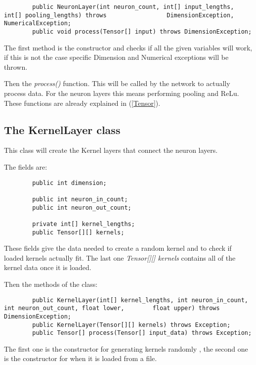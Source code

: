 \documentclass[12pt, titlepage]{article}
\begin{document}
		\begin{lstlisting}
		public NeuronLayer(int neuron_count, int[] input_lengths, int[] pooling_lengths) throws 				DimensionException, NumericalException;
		public void process(Tensor[] input) throws DimensionException;
		\end{lstlisting}
		
		The first method is the constructor and checks if all the given variables will work, if this is not the case specific Dimension and Numerical exceptions will be thrown.
		
		Then the \textit{process()} function. This will be called by the network to actually process data. For the neuron layers this means performing pooling and ReLu. These functions are already explained in (\ref{Tensor}).
		
		\pagebreak
		\subsection{The KernelLayer class}
		This class will create the Kernel layers that connect the neuron layers.
		
		The fields are:
		\begin{lstlisting}
		public int dimension;
		
		public int neuron_in_count;
		public int neuron_out_count;
		
		private int[] kernel_lengths;
		public Tensor[][] kernels;
		\end{lstlisting}
		
		These fields give the data needed to create a random kernel and to check if loaded kernels actually fit. The last one \textit{Tensor[][] kernels} contains all of the kernel data once it is loaded.
		
		Then the methods of the class:
		\begin{lstlisting}
		public KernelLayer(int[] kernel_lengths, int neuron_in_count, int neuron_out_count, float lower, 		float upper) throws DimensionException;
		public KernelLayer(Tensor[][] kernels) throws Exception;
		public Tensor[] process(Tensor[] input_data) throws Exception;
		\end{lstlisting}
		
		The first one is the constructor for generating kernels randomly , the second one is the constructor for when it is loaded from a file.
		
\end{document}
